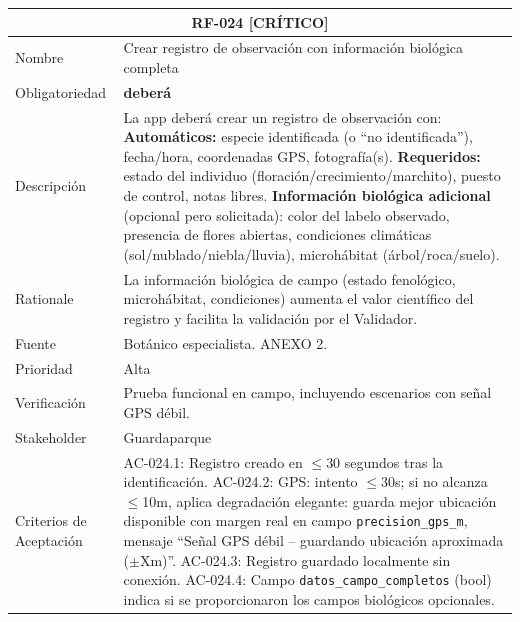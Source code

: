 \documentclass[12pt, a4paper]{article}
\newcommand{\criticomark}{\textcolor{criticolor}{\textbf{[CR\'ITICO]}}}
\begin{document}
\begin{longtable}{|p{3cm}|p{11.5cm}|}
\hline
\multicolumn{2}{|c|}{\textbf{RF-024} \criticomark} \\
\hline
Nombre & Crear registro de observaci\'on con informaci\'on biol\'ogica completa \\
\hline
Obligatoriedad & \textbf{deber\'a} \\
\hline
Descripci\'on & La app deber\'a crear un registro de observaci\'on con:\newline
\textbf{Autom\'aticos:} especie identificada (o ``no identificada''), fecha/hora, coordenadas GPS, fotograf\'ia(s).\newline
\textbf{Requeridos:} estado del individuo (floraci\'on/crecimiento/marchito), puesto de control, notas libres.\newline
\textbf{Informaci\'on biol\'ogica adicional} (opcional pero solicitada): color del labelo observado, presencia de flores abiertas, condiciones clim\'aticas (sol/nublado/niebla/lluvia), microh\'abitat (\'arbol/roca/suelo). \\
\hline
Rationale & La informaci\'on biol\'ogica de campo (estado fenol\'ogico, microh\'abitat, condiciones) aumenta el valor cient\'ifico del registro y facilita la validaci\'on por el Validador. \\
\hline
Fuente & Bot\'anico especialista. ANEXO 2. \\
\hline
Prioridad & Alta \\
\hline
Verificaci\'on & Prueba funcional en campo, incluyendo escenarios con se\~nal GPS d\'ebil. \\
\hline
Stakeholder & Guardaparque \\
\hline
Criterios de Aceptaci\'on &
AC-024.1: Registro creado en $\leq$30 segundos tras la identificaci\'on. \newline
AC-024.2: GPS: intento $\leq$30s; si no alcanza $\leq$10m, aplica degradaci\'on elegante: guarda mejor ubicaci\'on disponible con margen real en campo \texttt{precision\_gps\_m}, mensaje ``Se\~nal GPS d\'ebil -- guardando ubicaci\'on aproximada ($\pm$Xm)''. \newline
AC-024.3: Registro guardado localmente sin conexi\'on. \newline
AC-024.4: Campo \texttt{datos\_campo\_completos} (bool) indica si se proporcionaron los campos biol\'ogicos opcionales. \\
\hline
\end{longtable}
\end{document}
